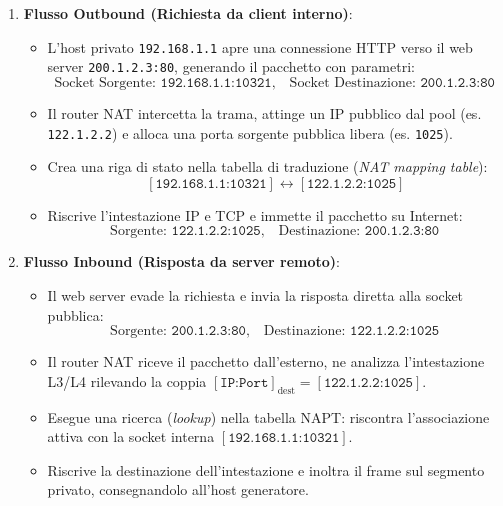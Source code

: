 \documentclass[11pt, a4paper]{article}
\begin{document}

\begin{enumerate}
    \item \textbf{Flusso Outbound (Richiesta da client interno)}:
    \begin{itemize}
        \item L'host privato \texttt{192.168.1.1} apre una connessione HTTP verso il web server \texttt{200.1.2.3:80}, generando il pacchetto con parametri:
        \[
        \text{Socket Sorgente: } \texttt{192.168.1.1:10321}, \quad \text{Socket Destinazione: } \texttt{200.1.2.3:80}
        \]
        \item Il router NAT intercetta la trama, attinge un IP pubblico dal pool (es. \texttt{122.1.2.2}) e alloca una porta sorgente pubblica libera (es. \texttt{1025}).
        \item Crea una riga di stato nella tabella di traduzione (\emph{NAT mapping table}):
        \[
        [\texttt{192.168.1.1:10321}] \longleftrightarrow [\texttt{122.1.2.2:1025}]
        \]
        \item Riscrive l'intestazione IP e TCP e immette il pacchetto su Internet:
        \[
        \text{Sorgente: } \texttt{122.1.2.2:1025}, \quad \text{Destinazione: } \texttt{200.1.2.3:80}
        \]
    \end{itemize}


    \item \textbf{Flusso Inbound (Risposta da server remoto)}:
    \begin{itemize}
        \item Il web server evade la richiesta e invia la risposta diretta alla socket pubblica:
        \[
        \text{Sorgente: } \texttt{200.1.2.3:80}, \quad \text{Destinazione: } \texttt{122.1.2.2:1025}
        \]
        \item Il router NAT riceve il pacchetto dall'esterno, ne analizza l'intestazione L3/L4 rilevando la coppia $[\texttt{IP:Port}]_{\text{dest}} = [\texttt{122.1.2.2:1025}]$.
        \item Esegue una ricerca (\emph{lookup}) nella tabella NAPT: riscontra l'associazione attiva con la socket interna $[\texttt{192.168.1.1:10321}]$.
        \item Riscrive la destinazione dell'intestazione e inoltra il frame sul segmento privato, consegnandolo all'host generatore.
    \end{itemize}
\end{enumerate}
\end{document}
